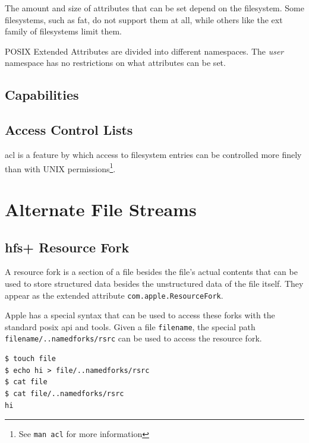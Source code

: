 \documentclass[a4paper]{article}
\begin{document}


The amount and size of attributes that can be set depend on the filesystem. Some filesystems, such as \gls{fat}, do not support them at all, while others like the \gls{ext} family of filesystems limit them.

POSIX Extended Attributes are divided into different namespaces. The \emph{user} namespace has no restrictions on what attributes can be set. 

\subsection{Capabilities}

\subsection{Access Control Lists}

\gls{acl} is a feature by which access to filesystem entries can be controlled more finely than with UNIX permissions\footnote{See \texttt{man acl} for more information}.


\section{Alternate File Streams}

\subsection{\gls{hfs+} Resource Fork}

A resource fork is a section of a file besides the file's actual contents that can be used to store structured data besides the unstructured data of the file itself. They appear as the extended attribute \verb|com.apple.ResourceFork|. 

Apple has a special syntax that can be used to access these forks with the standard \gls{posix} \gls{api} and tools. Given a file \verb|filename|, the special path \verb|filename/..namedforks/rsrc| can be used to access the resource fork.

\begin{verbatim}
$ touch file
$ echo hi > file/..namedforks/rsrc
$ cat file
$ cat file/..namedforks/rsrc
hi  
\end{verbatim}
\end{document}
